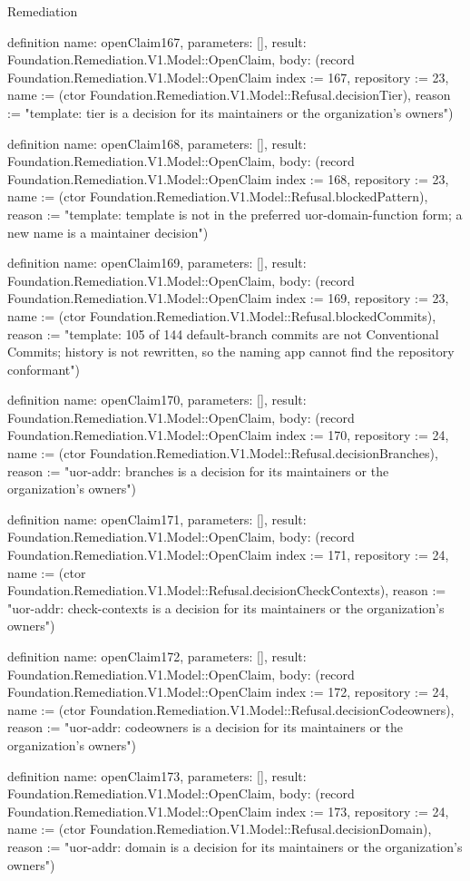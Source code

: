 \begin{lexlean}{Remediation}
\begin{semanticmodule}
definition{
  name: openClaim167,
  parameters: [],
  result: Foundation.Remediation.V1.Model::OpenClaim,
  body: (record Foundation.Remediation.V1.Model::OpenClaim {index := 167, repository := 23, name := (ctor Foundation.Remediation.V1.Model::Refusal.decisionTier), reason := "template: tier is a decision for its maintainers or the organization's owners"})
}

definition{
  name: openClaim168,
  parameters: [],
  result: Foundation.Remediation.V1.Model::OpenClaim,
  body: (record Foundation.Remediation.V1.Model::OpenClaim {index := 168, repository := 23, name := (ctor Foundation.Remediation.V1.Model::Refusal.blockedPattern), reason := "template: template is not in the preferred uor-{domain}-{function} form; a new name is a maintainer decision"})
}

definition{
  name: openClaim169,
  parameters: [],
  result: Foundation.Remediation.V1.Model::OpenClaim,
  body: (record Foundation.Remediation.V1.Model::OpenClaim {index := 169, repository := 23, name := (ctor Foundation.Remediation.V1.Model::Refusal.blockedCommits), reason := "template: 105 of 144 default-branch commits are not Conventional Commits; history is not rewritten, so the naming app cannot find the repository conformant"})
}

definition{
  name: openClaim170,
  parameters: [],
  result: Foundation.Remediation.V1.Model::OpenClaim,
  body: (record Foundation.Remediation.V1.Model::OpenClaim {index := 170, repository := 24, name := (ctor Foundation.Remediation.V1.Model::Refusal.decisionBranches), reason := "uor-addr: branches is a decision for its maintainers or the organization's owners"})
}

definition{
  name: openClaim171,
  parameters: [],
  result: Foundation.Remediation.V1.Model::OpenClaim,
  body: (record Foundation.Remediation.V1.Model::OpenClaim {index := 171, repository := 24, name := (ctor Foundation.Remediation.V1.Model::Refusal.decisionCheckContexts), reason := "uor-addr: check-contexts is a decision for its maintainers or the organization's owners"})
}

definition{
  name: openClaim172,
  parameters: [],
  result: Foundation.Remediation.V1.Model::OpenClaim,
  body: (record Foundation.Remediation.V1.Model::OpenClaim {index := 172, repository := 24, name := (ctor Foundation.Remediation.V1.Model::Refusal.decisionCodeowners), reason := "uor-addr: codeowners is a decision for its maintainers or the organization's owners"})
}

definition{
  name: openClaim173,
  parameters: [],
  result: Foundation.Remediation.V1.Model::OpenClaim,
  body: (record Foundation.Remediation.V1.Model::OpenClaim {index := 173, repository := 24, name := (ctor Foundation.Remediation.V1.Model::Refusal.decisionDomain), reason := "uor-addr: domain is a decision for its maintainers or the organization's owners"})
}


\end{semanticmodule}
\end{lexlean}
